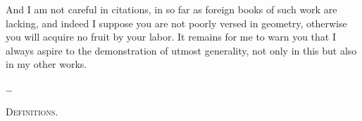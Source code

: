 \documentclass[11pt,letterpaper]{book}
\begin{document}
And I am not careful in citations, in so far as foreign books of such work are
lacking, and indeed I suppose you are not poorly versed in geometry,
otherwise you will acquire no fruit by your labor.
It remains for me to warn you that I always aspire to the demonstration of
utmost generality, not only in this but also in my other works.

\ldots

\mainmatter
\begin{center}
\Huge\textsc{Definitions.}
\end{center}
\end{document}
